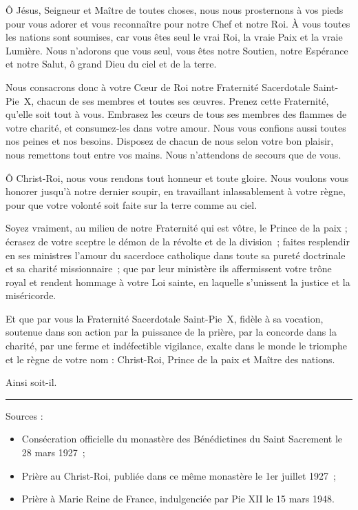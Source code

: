 \documentclass[%
a5paper%
,11pt%
,DIV=15%
,titlepage=on%
,headings=optiontoheadandtoc%
,headings=small%
,parskip=false%
,openany%
]{scrbook}
\begin{document}
\begin{multicols}{2}
Ô Jésus, Seigneur et Maître de toutes choses, nous nous prosternons à vos pieds pour vous adorer et vous reconnaître pour notre Chef et notre Roi. À vous toutes les nations sont soumises, car vous êtes seul le vrai Roi, la vraie Paix et la vraie Lumière. Nous n'adorons que vous seul, vous êtes notre Soutien, notre Espérance et notre Salut, ô grand Dieu du ciel et de la terre.

Nous consacrons donc à votre Cœur de Roi notre Fraternité Sacerdotale Saint-Pie X, chacun de ses membres et toutes ses œuvres. Prenez cette Fraternité, qu'elle soit tout à vous. Embrasez les cœurs de tous ses membres des flammes de votre charité, et consumez-les dans votre amour. Nous vous confions aussi toutes nos peines et nos besoins. Disposez de chacun de nous selon votre bon plaisir, nous remettons tout entre vos mains. Nous n'attendons de secours que de vous. 

Ô Christ-Roi, nous vous rendons tout honneur et toute gloire. Nous voulons vous honorer jusqu'à notre dernier soupir, en travaillant inlassablement à votre règne, pour que votre volonté soit faite sur la terre comme au ciel.

Soyez vraiment, au milieu de notre Fraternité qui est vôtre, le Prince de la paix ; écrasez de votre sceptre le démon de la révolte et de la division ; faites resplendir en ses ministres l’amour du sacerdoce catholique dans toute sa pureté doctrinale et sa charité missionnaire ; que par leur ministère ils affermissent votre trône royal et rendent hommage à votre Loi sainte, en laquelle s'unissent la justice et la miséricorde.

Et que par vous la Fraternité Sacerdotale Saint-Pie X, fidèle à sa vocation, soutenue dans son action par la puissance de la prière, par la concorde dans la charité, par une ferme et indéfectible vigilance, exalte dans le monde le triomphe et le règne de votre nom : Christ-Roi, Prince de la paix et Maître des nations.

Ainsi soit-il.

\noindent\rule{.5\linewidth}{1sp}

{\footnotesize
\noindent Sources :
\begin{itemize}
\item Consécration officielle du monastère des Bénédictines du Saint Sacrement le 28 mars 1927 ;
\item Prière au Christ-Roi, publiée dans ce même monastère le 1er juillet 1927 ;
\item Prière à Marie Reine de France, indulgenciée par Pie XII le 15 mars 1948.
\end{itemize}
}
\end{multicols}
\end{document}

